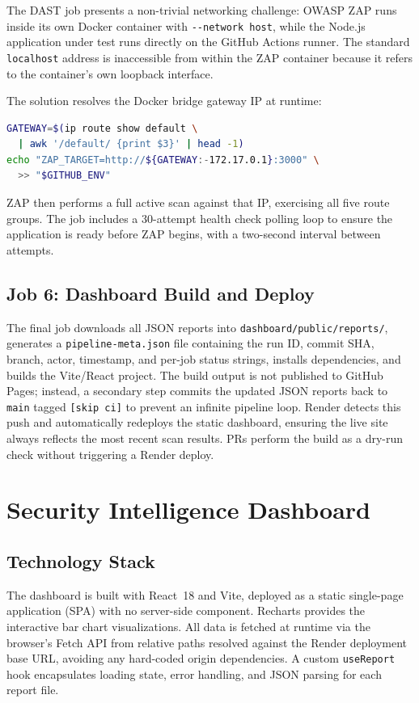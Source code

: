 \documentclass[10pt,conference]{IEEEtran}
\begin{document}
The DAST job presents a non-trivial networking challenge: OWASP ZAP runs
inside its own Docker container with \texttt{-{}-network host}, while the
Node.js application under test runs directly on the GitHub Actions runner.
The standard \texttt{localhost} address is inaccessible from within the ZAP
container because it refers to the container's own loopback interface.

The solution resolves the Docker bridge gateway IP at runtime:
\begin{lstlisting}[language=bash,caption=Runtime gateway resolution]
GATEWAY=$(ip route show default \
  | awk '/default/ {print $3}' | head -1)
echo "ZAP_TARGET=http://${GATEWAY:-172.17.0.1}:3000" \
  >> "$GITHUB_ENV"
\end{lstlisting}
ZAP then performs a full active scan against that IP, exercising all five
route groups.
The job includes a 30-attempt health check polling loop to ensure the
application is ready before ZAP begins, with a two-second interval between
attempts.

\subsection{Job 6: Dashboard Build and Deploy}

The final job downloads all JSON reports into \texttt{dashboard/public/reports/},
generates a \texttt{pipeline-meta.json} file containing the run ID, commit
SHA, branch, actor, timestamp, and per-job status strings, installs
dependencies, and builds the Vite/React project.
The build output is not published to GitHub Pages; instead, a secondary step
commits the updated JSON reports back to \texttt{main} tagged
\texttt{[skip ci]} to prevent an infinite pipeline loop.
Render detects this push and automatically redeploys the static dashboard,
ensuring the live site always reflects the most recent scan results.
PRs perform the build as a dry-run check without triggering a Render deploy.

\section{Security Intelligence Dashboard}

\subsection{Technology Stack}

The dashboard is built with React~18 and Vite, deployed as a static single-page
application (SPA) with no server-side component.
Recharts provides the interactive bar chart visualizations.
All data is fetched at runtime via the browser's Fetch API from relative paths
resolved against the Render deployment base URL, avoiding any hard-coded origin
dependencies.
A custom \texttt{useReport} hook encapsulates loading state, error handling,
and JSON parsing for each report file.
\end{document}
